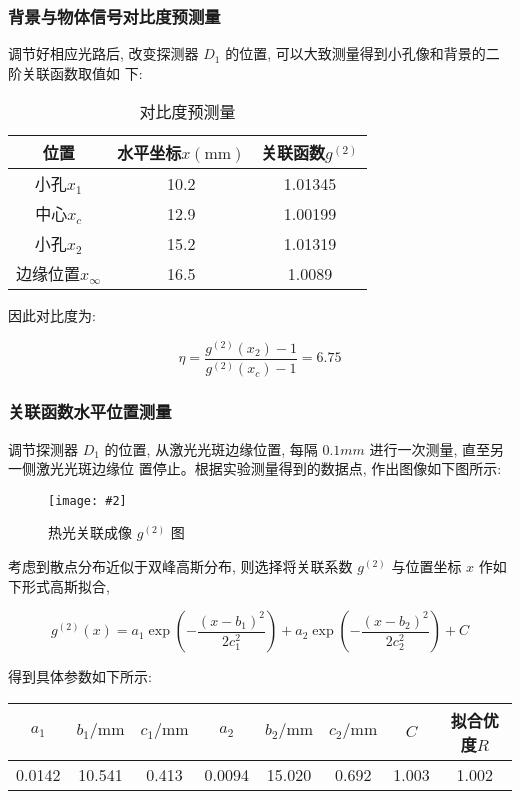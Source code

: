 \documentclass[12pt,a4paper]{article}
\newcommand{\be}[1]{
    \begin{equation}
        #1
    \end{equation}
}
\newcommand{\bfig}[3]{
    \begin{figure}[H]
        \centering
        \texttt{[image: \#2]}
        \caption{#3}
    \end{figure}
}
\begin{document}
\subsubsection{背景与物体信号对比度预测量}


调节好相应光路后, 改变探测器 $D_1$ 的位置, 可以大致测量得到小孔像和背景的二阶关联函数取值如
下:
\begin{table}[H]
    \centering
    \begin{tabular}{|c|c|c|}
    \hline
    位置     & 水平坐标$x(\mathrm{mm})$ & 关联函数$g^{(2)}$  \\ \hline
    小孔$x_1$   & 10.2  & 1.01345 \\ \hline
    中心$x_c$   & 12.9  & 1.00199 \\ \hline
    小孔$x_2$   & 15.2  & 1.01319 \\ \hline
    边缘位置$x_{\infty}$ & 16.5  & 1.0089 \\ \hline
    \end{tabular}
    \caption{对比度预测量}
    \end{table}


因此对比度为:
\be{\eta=\frac{g^{(2)}\left(x_{2}\right)-1}{g^{(2)}\left(x_{c}\right)-1}=6.75}

\subsubsection{关联函数水平位置测量}
调节探测器 $D_1$ 的位置, 从激光光斑边缘位置, 每隔 $0.1mm$ 进行一次测量, 直至另一侧激光光斑边缘位
置停止。根据实验测量得到的数据点, 作出图像如下图所示:
\bfig{0.8}{空间关联2.png}{ 热光关联成像 $g^{(2)}$ 图}
考虑到散点分布近似于双峰高斯分布, 则选择将关联系数 $g^{(2)}$ 与位置坐标 $x$ 作如下形式高斯拟合,
\be{g^{(2)}(x)=a_{1} \exp \left(-\frac{\left(x-b_{1}\right)^{2}}{2 c_{1}^{2}}\right)+a_{2} \exp \left(-\frac{\left(x-b_{2}\right)^{2}}{2 c_{2}^{2}}\right)+C}
得到具体参数如下所示:
\begin{table}[H]
    \centering
    \begin{tabular}{|c|c|c|c|c|c|c|c|}
    \hline
     $a_1$          & $b_1/\mathrm{mm}$          & $c_1/\mathrm{mm}$          & $a_2$          & $b_2/\mathrm{mm}$         & $c_2/\mathrm{mm}$         &$ C$           & 拟合优度$R$  \\ \hline
    0.0142 & 10.541 & 0.413 & 0.0094 & 15.020 & 0.692 & 1.003 & 1.002 \\ \hline
    \end{tabular}
    \end{table}
\end{document}
